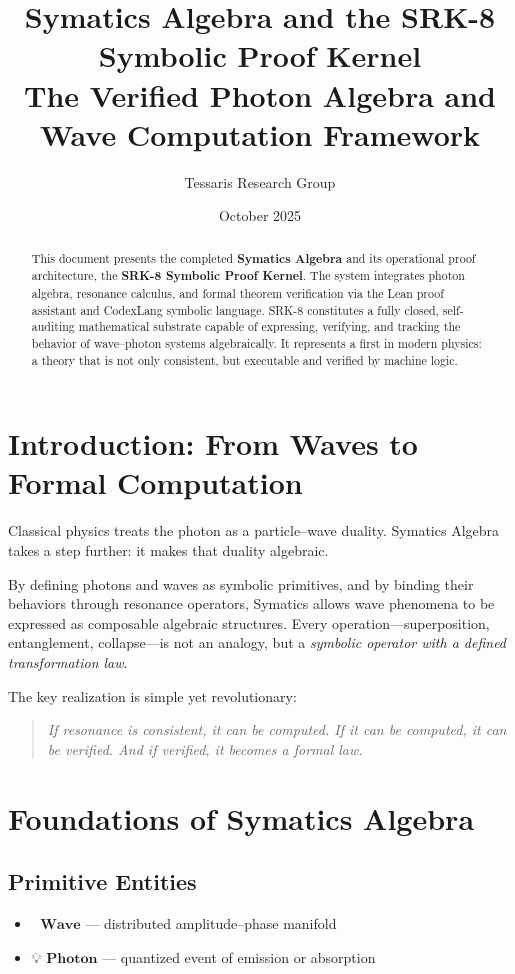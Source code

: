 \documentclass[12pt]{article}
\title{\textbf{Symatics Algebra and the SRK-8 Symbolic Proof Kernel}\\[4pt]
\large The Verified Photon Algebra and Wave Computation Framework}
\author{Tessaris Research Group}
\date{October 2025}
\begin{document}
\maketitle

\begin{abstract}
This document presents the completed \textbf{Symatics Algebra} and its operational proof architecture, the \textbf{SRK-8 Symbolic Proof Kernel}.  
The system integrates photon algebra, resonance calculus, and formal theorem verification via the Lean proof assistant and CodexLang symbolic language.  
SRK-8 constitutes a fully closed, self-auditing mathematical substrate capable of expressing, verifying, and tracking the behavior of wave–photon systems algebraically.  
It represents a first in modern physics: a theory that is not only consistent, but executable and verified by machine logic.
\end{abstract}

\section{Introduction: From Waves to Formal Computation}

Classical physics treats the photon as a particle–wave duality.  
Symatics Algebra takes a step further: it makes that duality algebraic.

By defining photons and waves as symbolic primitives, and by binding their behaviors through resonance operators, Symatics allows wave phenomena to be expressed as composable algebraic structures.  
Every operation—superposition, entanglement, collapse—is not an analogy, but a \emph{symbolic operator with a defined transformation law}.

\medskip
The key realization is simple yet revolutionary:
\begin{quote}
    \emph{If resonance is consistent, it can be computed.  
    If it can be computed, it can be verified.  
    And if verified, it becomes a formal law.}
\end{quote}

\section{Foundations of Symatics Algebra}

\subsection{Primitive Entities}
\begin{itemize}[noitemsep]
    \item $\textbf{🌊 Wave}$ — distributed amplitude–phase manifold
    \item $\textbf{💡 Photon}$ — quantized event of emission or absorption
\end{itemize}
\end{document}

